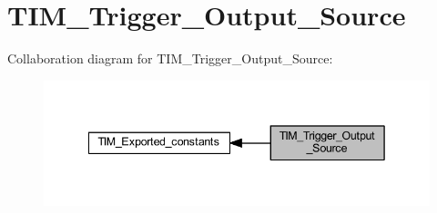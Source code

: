 \hypertarget{group___t_i_m___trigger___output___source}{}\section{T\+I\+M\+\_\+\+Trigger\+\_\+\+Output\+\_\+\+Source}
\label{group___t_i_m___trigger___output___source}
Collaboration diagram for T\+I\+M\+\_\+\+Trigger\+\_\+\+Output\+\_\+\+Source\+:
\nopagebreak
\begin{figure}[H]
\begin{center}
\leavevmode
\includegraphics[width=342pt]{group___t_i_m___trigger___output___source}
\end{center}
\end{figure}
